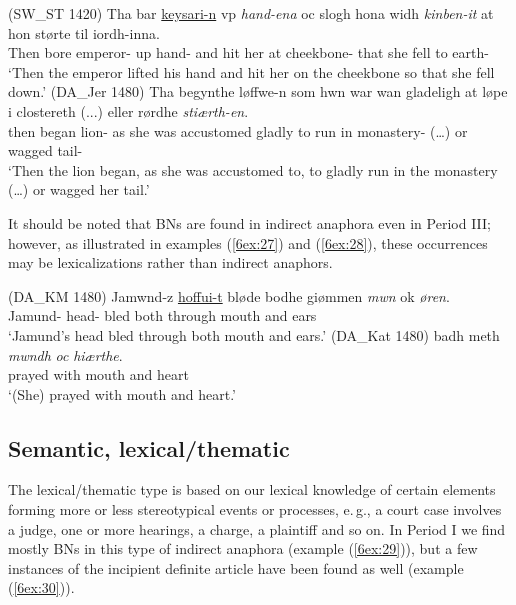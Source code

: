 \documentclass[output=paper]{langsci/langscibook}
\begin{document}
\begin{exe}
\ex\label{6ex:25}
(SW\_ST 1420)
\exi{}
\gll Tha bar {\ul{keysari-n}} vp {\emph{hand-ena}} oc slogh hona widh {\emph{kinben-it}} at hon størte til iordh-inna. \\
Then bore emperor-{} up hand-{} and hit her at cheekbone-{} that she fell to earth-{} \\
\glt `Then the emperor lifted his hand and hit her on the cheekbone so that she fell down.'
\ex\label{6ex:26}
(DA\_Jer 1480) 
\exi{}
\gll Tha begynthe løffwe-n som hwn war wan gladeligh at løpe i clostereth (...) eller rørdhe {\emph{stiærth-en}}. \\
then began lion-{} as she was accustomed gladly to run in monastery-{} (…) or wagged tail-{}  \\
\glt `Then the lion began, as she was accustomed to, to gladly run in the monastery (…) or wagged her tail.'
\end{exe}

It should be noted that BNs are found in indirect anaphora even in Period III; however, as illustrated in examples (\ref{6ex:27}) and (\ref{6ex:28}), these occurrences may be lexicalizations rather than indirect anaphors. 

\begin{exe}
\ex\label{6ex:27}
(DA\_KM 1480)
\exi{}
\gll Jamwnd-z {\ul{hoffui-t}} bløde bodhe giømmen {\emph{mwn}} ok {\emph{øren}}.  \\
Jamund-{} head-{} bled both through mouth and ears \\
\glt `Jamund's head bled through both mouth and ears.' 
\ex\label{6ex:28}
(DA\_Kat 1480)
\exi{}
\gll badh meth {\emph{mwndh}} {\emph{oc}} {\emph{hiærthe}}. \\
prayed with mouth and heart \\
\glt `(She) prayed with mouth and heart.' 
\end{exe}

\subsection{Semantic, lexical/thematic}\label{6sec:42}

The lexical/thematic type is based on our lexical knowledge of certain elements forming more or less stereotypical events or processes, e.\,g., a court case involves a judge, one or more hearings, a charge, a plaintiff and so on. In Period I we find mostly BNs in this type of indirect anaphora (example (\ref{6ex:29})), but a few instances of the incipient definite article have been found as well (example (\ref{6ex:30})). 
\end{document}

